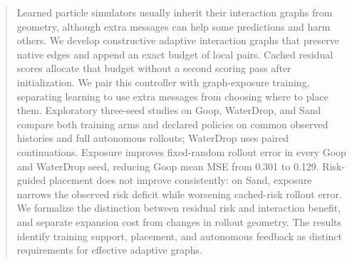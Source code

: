 \begin{abstract}
Learned particle simulators usually inherit their interaction graphs from geometry, although extra messages can help some predictions and harm others. We develop constructive adaptive interaction graphs that preserve native edges and append an exact budget of local pairs. Cached residual scores allocate that budget without a second scoring pass after initialization. We pair this controller with graph-exposure training, separating learning to use extra messages from choosing where to place them. Exploratory three-seed studies on Goop, WaterDrop, and Sand compare both training arms and declared policies on common observed histories and full autonomous rollouts; WaterDrop uses paired continuations. Exposure improves fixed-random rollout error in every Goop and WaterDrop seed, reducing Goop mean MSE from 0.301 to 0.129. Risk-guided placement does not improve consistently: on Sand, exposure narrows the observed risk deficit while worsening cached-risk rollout error. We formalize the distinction between residual risk and interaction benefit, and separate expansion cost from changes in rollout geometry. The results identify training support, placement, and autonomous feedback as distinct requirements for effective adaptive graphs.
\end{abstract}
